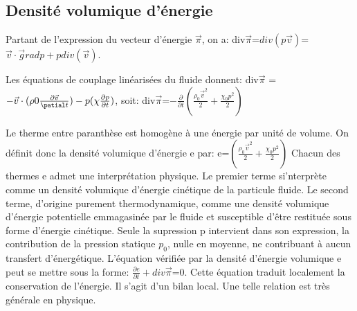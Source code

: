 \documentclass[a4paper, 12pt]{article}
\begin{document}
\subsection{Densité volumique d'énergie}
\begin{text}
Partant de l'expression du vecteur d'énergie $\vec \pi$, on a:\newline 
div$\vec \pi$=$div(p\vec v)$=$\vec v \cdot \vec grad p + pdiv(\vec v)$.\newline 

Les équations de couplage linéarisées du fluide donnent:\newline 
div$\vec \pi$ = $-\vec v \cdot (\rho{0} \frac{\partial \vec v}{\patial t})-p(\chi\frac{\partial p}{\partial t})$,\newline 
soit:\newline 
div$\vec \pi$=$-\frac{\partial}{\partial t}(\frac{\rho_{0}\vec v^{2}}{2}+\frac{\chi_{0}p^{2}}{2})$\newline 

Le therme entre paranthèse est homogène à une énergie par unité de volume. On définit donc la densité volumique d'énergie e par:\newline
e=$(\frac{\rho_{0}\vec v^{2}}{2}+\frac{\chi_{0}p^{2}}{2})$\newline 
Chacun des thermes e admet une interprétation physique. Le premier terme si'nterprète comme un densité volumique d'énergie cinétique de la particule fluide. Le second terme, d'origine purement thermodynamique,
comme une densité volumique d'énergie potentielle emmagasinée par le fluide et susceptible d'être restituée sous forme d'énergie cinétique. Seule la supression p intervient dans son expression, la contribution de la pression statique $p_{0}$, nulle en moyenne, ne contribuant à aucun transfert d'énergétique. L'équation vérifiée par la densité d'énergie volumique e peut se mettre sous la forme:
$\frac{\partial e}{\partial t}+div \vec \pi$=0. \newline 
Cette équation traduit localement la conservation de l'énergie. Il s'agit d'un bilan local. Une telle relation est très générale en physique. \newline 


\end{text}
\end{document}
